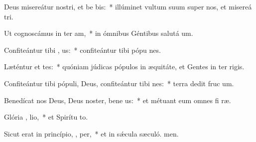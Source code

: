 \item Deus misereátur nostri, et be bis:~* illúminet vultum suum super nos, et misereá tri.
\item Ut cognoscámus in ter  am,~* in ómnibus Géntibus salutá um.
\item Confiteántur tibi , us:~* confiteántur tibi pópu nes.
\item Læténtur et  tes:~* quóniam júdicas pópulos in æquitáte, et Gentes in ter rigis.
\item Confiteántur tibi pópuli, Deus, confiteántur tibi  nes:~* terra dedit fruc um.
\item Benedícat nos Deus, Deus noster, bene  us:~* et métuant eum omnes fi ræ.
\item Glória ,  lio,~* et Spirítu to.
\item Sicut erat in princípio,  ,  per,~* et in sǽcula sæculó. men.
